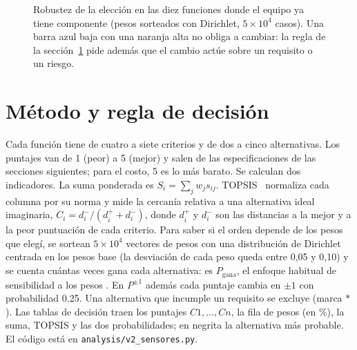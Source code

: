 \begin{figure}[H]
\centering
{}
\caption{Robustez de la elección en las diez funciones donde el equipo ya tiene componente
(pesos sorteados con Dirichlet, $5\times10^4$ casos). Una barra azul baja con una naranja alta
no obliga a cambiar: la regla de la sección~\ref{sec:sensores-metodo} pide además que el cambio
actúe sobre un requisito o un riesgo.}
\label{fig:sens-prob}
\end{figure}

\section{Método y regla de decisión}\label{sec:sensores-metodo}

Cada función tiene de cuatro a siete criterios y de dos a cinco alternativas. Los puntajes van
de 1 (peor) a 5 (mejor) y salen de las especificaciones de las secciones siguientes; para el
costo, 5 es lo más barato. Se calculan dos indicadores. La suma ponderada es
$S_i=\sum_j w_j s_{ij}$. TOPSIS~\cite{sensores-hwang1981} normaliza cada columna por su norma
y mide la cercanía relativa a una alternativa ideal imaginaria,
$C_i=d_i^-/(d_i^++d_i^-)$, donde $d_i^+$ y $d_i^-$ son las distancias a la mejor y a la peor
puntuación de cada criterio. Para saber si el orden depende de los pesos que elegí, se sortean
$5\times10^4$ vectores de pesos con una distribución de Dirichlet centrada en los pesos base
(la desviación de cada peso queda entre 0,05 y 0,10) y se cuenta cuántas veces gana cada
alternativa: es $P_{\text{gana}}$, el enfoque habitual de sensibilidad a los pesos
\cite{sensores-triantaphyllou1997}. En $P^{\pm1}$ además cada puntaje cambia en $\pm1$ con
probabilidad \num{0.25}. Una alternativa que incumple un requisito se excluye (marca $\ast$).
Las tablas de decisión traen los puntajes $C1,\dots,Cn$, la fila de pesos (en \%), la suma, TOPSIS y las dos
probabilidades; en negrita la alternativa más probable. El código está en
\texttt{analysis/v2\_sensores.py}.

